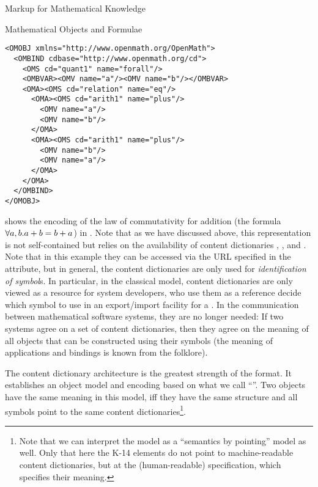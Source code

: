\begin{tchapter}[id=math-markup]{Markup for Mathematical Knowledge}
\begin{tsection}[id=math-objects]{Mathematical Objects and Formulae}
\begin{tsubsection}[id=math-markup:openmath]{\openmath}
\begin{lstlisting}[label=lst:om-comm,
    caption={{\openmath} Representation of $\allcdot{a,b}{a+b=b+a}$},
    language=OpenMath,
    index={OMOBJ,OMBIND,OMS,OMBVAR,OMV,OMATTR,OMATP}]
<OMOBJ xmlns="http://www.openmath.org/OpenMath">                            
  <OMBIND cdbase="http://www.openmath.org/cd">                          
    <OMS cd="quant1" name="forall"/> 
    <OMBVAR><OMV name="a"/><OMV name="b"/></OMBVAR>                        
    <OMA><OMS cd="relation" name="eq"/> 
      <OMA><OMS cd="arith1" name="plus"/>
        <OMV name="a"/>               
        <OMV name="b"/>               
      </OMA>                         
      <OMA><OMS cd="arith1" name="plus"/>
        <OMV name="b"/>               
        <OMV name="a"/>               
      </OMA>      
    </OMA>                           
  </OMBIND>                         
</OMOBJ>
\end{lstlisting}
  {} shows the {\xml} encoding of the law of commutativity for addition
  (the formula ${\forall{a,b}.{a+b=b+a}}$) in {\openmath}. Note that as we have discussed
  above, this representation is not self-contained but relies on the availability of
  content dictionaries {},
  {}, and {}. Note that in this example they can be
  accessed via the URL specified in the {} attribute,
  but in general, the content dictionaries are only used for {\emph{identification of
      symbol}s}. In particular, in the classical {\openmath} model, content dictionaries
  are only viewed as a resource for system developers, who use them as a reference decide
  which symbol to use in an export/import facility for a {}. In the communication between mathematical software systems, they
  are no longer needed: If two systems agree on a set of content dictionaries, then they
  agree on the meaning of all {\openmath} objects that can be constructed using their
  symbols (the meaning of applications and bindings is known from the folklore).

  The content dictionary architecture is the greatest strength of the {\openmath}
  format. It establishes an object model and {\xml} encoding based on what we call
  ``''. Two {\openmath} objects have the same meaning in
  this model, iff they have the same structure and all symbols point to the same content
  dictionaries\footnote{Note that we can interpret the {\cmathml} model as a ``semantics
    by pointing'' model as well. Only that here the K-14 elements do not point to
    machine-readable content dictionaries, but at the (human-readable) {\mathml}
    specification, which specifies their meaning.}.


\end{tsubsection}
\end{tsection}
\end{tchapter}
